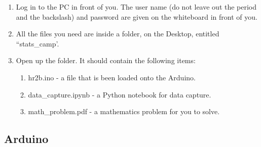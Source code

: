 \documentclass[11pt]{article}
\providecommand{\tightlist}{%
  \setlength{\itemsep}{0pt}\setlength{\parskip}{0pt}}
\begin{document}
\begin{enumerate}
\def\labelenumi{\arabic{enumi}.}
\tightlist
\item
  Log in to the PC in front of you. The user name (do not leave out the
  period and the backslash) and password are given on the whiteboard in front
of you.
\item
  All the files you need are inside a folder, on the Desktop, entitled
``stats\_camp'.
\item
  Open up the folder. It should contain the following items:
  \begin{enumerate}
  \def\labelenumii{\arabic{enumii}.}
  \tightlist
  \item
    hr2b.ino - a file that is been loaded onto the Arduino.
  \item
    data\_capture.ipynb - a Python notebook for data capture.
  \item
    math\_problem.pdf - a mathematics problem for you to solve.
  \end{enumerate}
\end{enumerate}

\hypertarget{arduino}{%
\subsection{Arduino}\label{arduino}}
\end{document}
